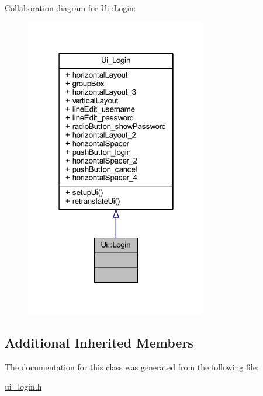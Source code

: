 Collaboration diagram for Ui\+:\+:Login\+:\nopagebreak
\begin{figure}[H]
\begin{center}
\leavevmode
\includegraphics[width=226pt]{class_ui_1_1_login__coll__graph}
\end{center}
\end{figure}
\subsection*{Additional Inherited Members}


The documentation for this class was generated from the following file\+:\begin{DoxyCompactItemize}
\item 
\hyperlink{ui__login_8h}{ui\+\_\+login.\+h}\end{DoxyCompactItemize}
